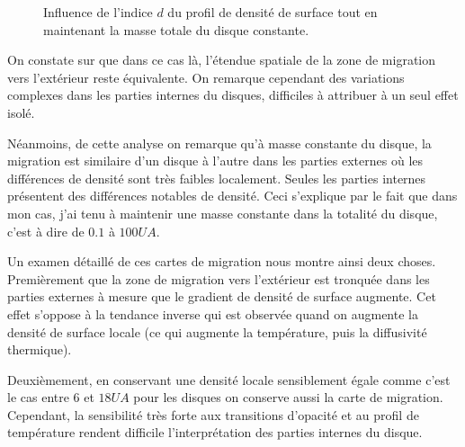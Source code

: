 \begin{figure}[htb]
\centering
{}\hfill
{}

\caption{Influence de l'indice $d$ du profil de densité de surface tout en maintenant la masse totale du disque constante. }\label{fig:map_index_mtot}
\end{figure}

On constate sur  que dans ce cas là, l'étendue spatiale de la zone de migration vers l'extérieur reste équivalente. On remarque cependant des variations complexes dans les parties internes du disques, difficiles à attribuer à un seul effet isolé. 

Néanmoins, de cette analyse on remarque qu'à masse constante du disque, la migration est similaire d'un disque à l'autre dans les parties externes où les différences de densité sont très faibles localement. Seules les parties internes présentent des différences notables de densité. Ceci s'explique par le fait que dans mon cas, j'ai tenu à maintenir une masse constante dans la totalité du disque, c'est à dire de $0.1$ à $100\unit{UA}$. 

\bigskip

Un examen détaillé de ces cartes de migration nous montre ainsi deux choses. Premièrement que la zone de migration vers l'extérieur est tronquée dans les parties externes à mesure que le gradient de densité de surface augmente. Cet effet s'oppose à la tendance inverse qui est observée quand on augmente la densité de surface locale (ce qui augmente la température, puis la diffusivité thermique). 

Deuxièmement, en conservant une densité locale sensiblement égale comme c'est le cas entre $6$ et $18\unit{UA}$ pour les disques  on conserve aussi la carte de migration. Cependant, la sensibilité très forte aux transitions d'opacité et au profil de température rendent difficile l'interprétation des parties internes du disque. 

